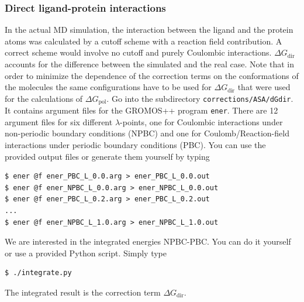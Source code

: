 \subsubsection{Direct ligand-protein interactions}
In the actual MD simulation, the interaction between the ligand and
the protein atoms was calculated by a cutoff scheme with a reaction
field contribution. A correct scheme would involve no cutoff and
purely Coulombic interactions. $\Delta
G_{\text{dir}}$ accounts for the difference between the simulated and the
real case. Note that in order to minimize the dependence of the
correction terms on the conformations of the molecules the same
configurations have to be used for $\Delta
G_{\text{dir}}$ that were used for the calculations of $\Delta
G_{\text{pol}}$. Go into the subdirectory
\texttt{corrections/ASA/dGdir}. It contains argument files for the
GROMOS++ program \texttt{ener}. There are 12 argument files for six
different $\lambda$-points,
one for Coulombic interactions under non-periodic boundary conditions
(NPBC) and one for Coulomb/Reaction-field interactions under periodic
boundary conditions (PBC). You can use the provided output files or
generate them yourself by typing
\begin{lstlisting}
$ ener @f ener_PBC_L_0.0.arg > ener_PBC_L_0.0.out
$ ener @f ener_NPBC_L_0.0.arg > ener_NPBC_L_0.0.out
$ ener @f ener_PBC_L_0.2.arg > ener_PBC_L_0.2.out
...
$ ener @f ener_NPBC_L_1.0.arg > ener_NPBC_L_1.0.out
\end{lstlisting}
%
We are interested in the integrated energies NPBC-PBC. You can do it
yourself or use a provided Python script. Simply type
\begin{lstlisting}
$ ./integrate.py 
\end{lstlisting}
The integrated result is the correction term $\Delta G_{\text{dir}}$. %

